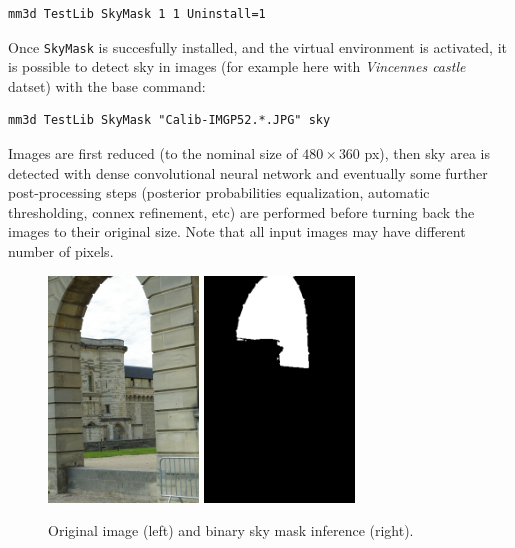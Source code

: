 \begin{verbatim}
mm3d TestLib SkyMask 1 1 Uninstall=1
\end{verbatim}

\noindent Once \texttt{SkyMask} is succesfully installed, and the virtual environment is activated, it is possible to detect sky in images (for example here with \textit{Vincennes castle} datset) with the base command: \newline

\begin{verbatim}
mm3d TestLib SkyMask "Calib-IMGP52.*.JPG" sky
\end{verbatim}

\noindent Images are first reduced (to the nominal size of $480\times360$ px), then sky area is detected with dense convolutional neural network and eventually some further post-processing steps (posterior probabilities equalization, automatic thresholding, connex refinement, etc) are performed before turning back the images to their original size. Note that all input images may have different number of pixels. \newline

\begin{figure}[!h]
	\begin{center}
		\includegraphics[width=40mm]{FIGS/SkyMask/im1.JPG}
		\hspace{0.2cm}
		\includegraphics[width=40mm]{FIGS/SkyMask/mask1.JPG}
		\caption{Original image (left) and binary sky mask inference (right).}
	\end{center}	
\end{figure}


